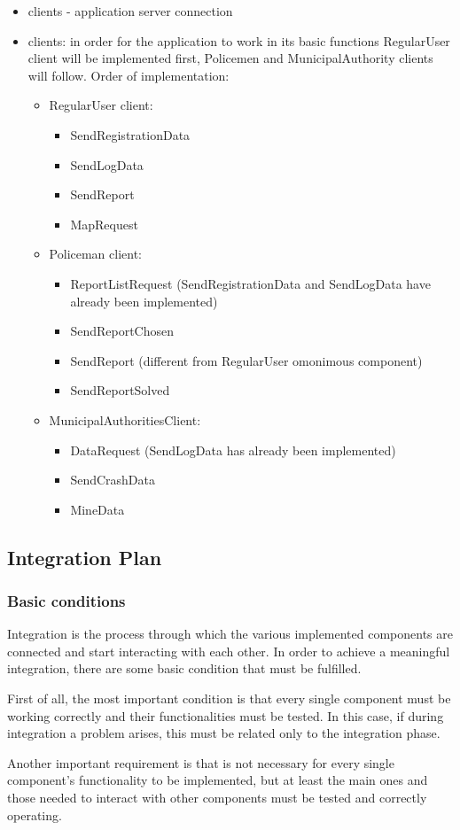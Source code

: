 \begin{itemize}
	\item clients - application server connection
	\item clients: in order for the application to work in its basic functions RegularUser client will be implemented first, Policemen and MunicipalAuthority clients will follow.\newline
	Order of implementation:
		\begin{itemize}
			\item RegularUser client:
			\begin{itemize}
				\item SendRegistrationData
				\item SendLogData
				\item SendReport
				\item MapRequest
			\end{itemize}
			\item Policeman client:
			\begin{itemize}
				\item ReportListRequest (SendRegistrationData and SendLogData have already been implemented)
				\item SendReportChosen
				\item SendReport (different from RegularUser omonimous component)
				\item SendReportSolved
			\end{itemize}
			\item MunicipalAuthoritiesClient:
				\begin{itemize}
					\item DataRequest (SendLogData has already been implemented)
					\item SendCrashData
					\item MineData
				\end{itemize} 
			\end{itemize}
	\end{itemize} 

\subsection{Integration Plan}
\subsubsection{Basic conditions}
Integration is the process through which the various implemented components are connected and start interacting with each other.
In order to achieve a meaningful integration, there are some basic condition that must be fulfilled. \par
First of all, the most important condition is that every single component must be working correctly and their functionalities must be tested. In this case, if during integration a problem arises, this must be related only to the integration phase. \par
Another important requirement is that is not necessary for every single component's functionality to be implemented, but at least the main ones and those needed to interact with other components must be tested and correctly operating.

